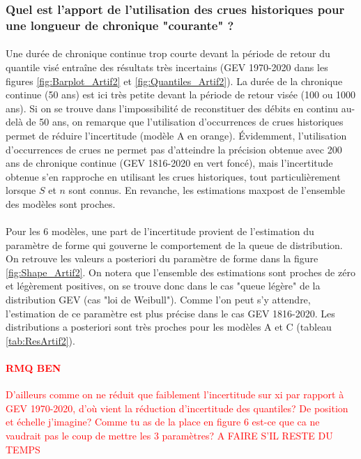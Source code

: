 \FloatBarrier
	
	\subsubsection{Quel est l'apport de l'utilisation des crues historiques pour une longueur de chronique "courante" ?}
	
	\paragraph{} Une durée de chronique continue trop courte devant la période de retour du quantile visé entraîne des résultats très incertains (GEV 1970-2020 dans les figures \ref{fig:Barplot_Artif2} et \ref{fig:Quantiles_Artif2}). La durée de la chronique continue (50 ans) est ici très petite devant la période de retour visée (100 ou 1000 ans). Si on se trouve dans l'impossibilité de reconstituer des débits en continu au-delà de 50 ans, on remarque que l'utilisation d'occurrences de crues historiques permet de réduire l'incertitude (modèle A en orange). Évidemment, l'utilisation d'occurrences de crues ne permet pas d'atteindre la précision obtenue avec 200 ans de chronique continue (GEV 1816-2020 en vert foncé), mais l'incertitude obtenue s'en rapproche en utilisant les crues historiques, tout particulièrement lorsque $S$ et $n$ sont connus. En revanche, les estimations maxpost de l'ensemble des modèles sont proches. 
	
	\paragraph{} Pour les 6 modèles, une part de l'incertitude provient de l'estimation du paramètre de forme qui gouverne le comportement de la queue de distribution. On retrouve les valeurs a posteriori du paramètre de forme dans la figure \ref{fig:Shape_Artif2}. On notera que l'ensemble des estimations sont proches de zéro et légèrement positives, on se trouve donc dans le cas "queue légère" de la distribution GEV (cas "loi de Weibull"). Comme l'on peut s'y attendre, l'estimation de ce paramètre est plus précise dans le cas GEV 1816-2020. Les distributions a posteriori sont très proches pour les modèles A et C (tableau \ref{tab:ResArtif2}). 
	
	\textcolor{red}{
	\paragraph{RMQ BEN} D'ailleurs comme on ne réduit que faiblement l'incertitude sur xi par rapport à GEV 1970-2020, d'où vient la réduction d'incertitude des quantiles? De position et échelle j'imagine? Comme tu as de la place en figure 6 est-ce que ca ne vaudrait pas le coup de mettre les 3 paramètres? A FAIRE S'IL RESTE DU TEMPS
	}
	

